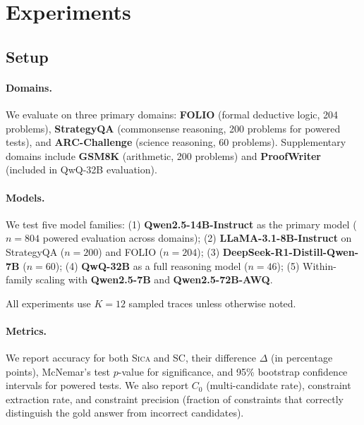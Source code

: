 \documentclass[11pt,a4paper]{article}
\newcommand{\sica}{\textsc{Sica}}
\begin{document}
\section{Experiments}
\label{sec:experiments}

\subsection{Setup}
\label{sec:setup}

\paragraph{Domains.}
We evaluate on three primary domains: \textbf{FOLIO} (formal deductive logic, 204 problems), \textbf{StrategyQA} (commonsense reasoning, 200 problems for powered tests), and \textbf{ARC-Challenge} (science reasoning, 60 problems).
Supplementary domains include \textbf{GSM8K} (arithmetic, 200 problems) and \textbf{ProofWriter} (included in QwQ-32B evaluation).

\paragraph{Models.}
We test five model families:
(1) \textbf{Qwen2.5-14B-Instruct} as the primary model ($n=804$ powered evaluation across domains);
(2) \textbf{LLaMA-3.1-8B-Instruct} on StrategyQA ($n=200$) and FOLIO ($n=204$);
(3) \textbf{DeepSeek-R1-Distill-Qwen-7B} ($n=60$);
(4) \textbf{QwQ-32B} as a full reasoning model ($n=46$);
(5) Within-family scaling with \textbf{Qwen2.5-7B} and \textbf{Qwen2.5-72B-AWQ}.

All experiments use $K=12$ sampled traces unless otherwise noted.

\paragraph{Metrics.}
We report accuracy for both \sica{} and SC, their difference $\Delta$ (in percentage points), McNemar's test $p$-value for significance, and 95\% bootstrap confidence intervals for powered tests.
We also report $C_0$ (multi-candidate rate), constraint extraction rate, and constraint precision (fraction of constraints that correctly distinguish the gold answer from incorrect candidates).

\end{document}

